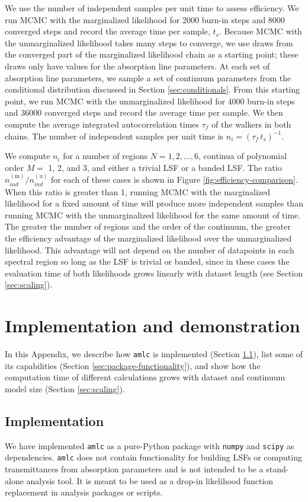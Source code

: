 \documentclass[trackchanges]{aastex62}
\newcommand{\pkgname}{\texttt{amlc}}
\begin{document}
{We use the number of independent samples per unit time to assess efficiency.
We run MCMC with the marginalized likelihood for 2000 burn-in steps and 8000 converged steps and record the average time per sample, $t_s$.
Because MCMC with the unmarginalized likelihood takes many steps to converge, we use draws from the converged part of the marginalized likelihood chain as a starting point; these draws only have values for the absorption line parameters.
At each set of absorption line parameters, we sample a set of continuum parameters from the conditional distribution discussed in Section \ref{sec:conditionals}.
From this starting point, we run MCMC with the unmarginalized likelihood for 4000 burn-in steps and 36000 converged steps and record the average time per sample.
We then compute the average integrated autocorrelation times $\tau_f$ of the walkers in both chains.
The number of independent samples per unit time is $n_i = \left(\tau_f \, t_s \right)^{-1}$.

We compute $n_i$ for a number of regions $N = 1, 2, \ldots, 6$, continua of polynomial order $M=$ 1, 2, and 3, and either a trivial LSF or a banded LSF.
The ratio $n_{ind}^{(\text{m})} / n_{ind}^{(\text{u})}$ for each of these cases is shown in Figure \ref{fig:efficiency-comparison}.
When this ratio is greater than 1, running MCMC with the marginalized likelihood for a fixed amount of time will produce more independent samples than running MCMC with the unmarginalized likelihood for the same amount of time.
The greater the number of regions and the order of the continuum, the greater the efficiency advantage of the marginalized likelihood over the unmarginalized likelihood.
This advantage will not depend on the number of datapoints in each spectral region so long as the LSF is trivial or banded, since in these cases the evaluation time of both likelihoods grows linearly with dataset length (see Section \ref{sec:scaling}).
}

\section{Implementation and demonstration}
\label{sec:package-and-demos}
In this Appendix, we describe how \pkgname{} is implemented (Section \ref{sec:implementation}), list some of its capabilities (Section \ref{sec:package-functionality}), and show how the computation time of different calculations grows with dataset and continuum model size (Section \ref{sec:scaling}).

\subsection{Implementation}
\label{sec:implementation}
We have implemented \pkgname{} as a pure-Python package with \texttt{numpy} and \texttt{scipy} as dependencies.
\pkgname{} does not contain functionality for building LSFs or computing transmittances from absorption parameters and is not intended to be a stand-alone analysis tool.
It is meant to be used as a drop-in likelihood function replacement in analysis packages or scripts.
\end{document}
